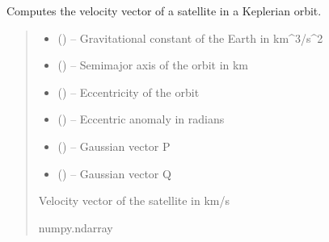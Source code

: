 \documentclass[letterpaper,10pt,english]{sphinxmanual}
\begin{document}

\begin{fulllineitems}
\label{\detokenize{fspsim.utils:fspsim.utils.Propagators.compute_velocity}}
\pysigstartsignatures
{}
\pysigstopsignatures
\sphinxAtStartPar
Computes the velocity vector of a satellite in a Keplerian orbit.
\begin{quote}\begin{description}
\begin{itemize}
\item {} 
\sphinxAtStartPar
{} () – Gravitational constant of the Earth in km\textasciicircum{}3/s\textasciicircum{}2

\item {} 
\sphinxAtStartPar
{} () – Semi\sphinxhyphen{}major axis of the orbit in km

\item {} 
\sphinxAtStartPar
{} () – Eccentricity of the orbit

\item {} 
\sphinxAtStartPar
{} () – Eccentric anomaly in radians

\item {} 
\sphinxAtStartPar
{} () – Gaussian vector P

\item {} 
\sphinxAtStartPar
{} () – Gaussian vector Q

\end{itemize}

\sphinxAtStartPar
Velocity vector of the satellite in km/s

\sphinxAtStartPar
numpy.ndarray

\end{description}\end{quote}

\end{fulllineitems}
\end{document}
